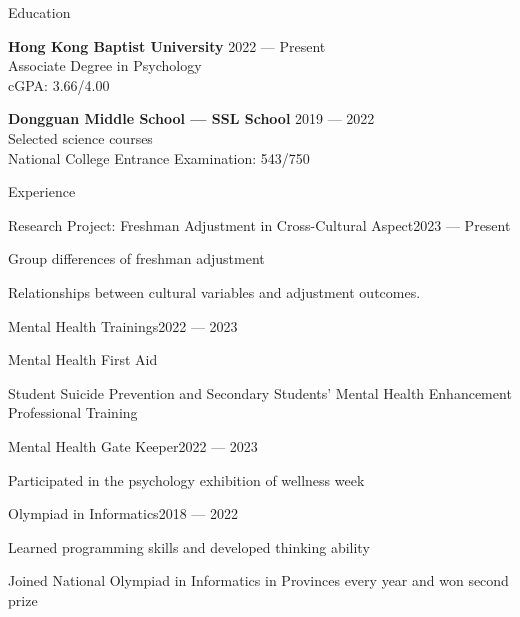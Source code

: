 \documentclass[
	11pt, %
]{resume} %
\begin{document}
\begin{rSection}{Education}

    \textbf{Hong Kong Baptist University} \hfill 2022 --- Present \\
    Associate Degree in Psychology \\
    cGPA: 3.66/4.00

    \textbf{Dongguan Middle School --- SSL School} \hfill 2019 --- 2022 \\
    Selected science courses \\
    National College Entrance Examination: 543/750

\end{rSection}


\begin{rSection}{Experience}

    \begin{rSubsection}{Research Project: Freshman Adjustment in Cross-Cultural Aspect}{2023 --- Present}{}{}
        \item Group differences of freshman adjustment
        \item Relationships between cultural variables and adjustment outcomes.
    \end{rSubsection}

    \begin{rSubsection}{Mental Health Trainings}{2022 --- 2023}{}{}
        \item Mental Health First Aid
        \item Student Suicide Prevention and Secondary Students' Mental Health Enhancement Professional Training
    \end{rSubsection}

    \begin{rSubsection}{Mental Health Gate Keeper}{2022 --- 2023}{}{}
        \item Participated in the psychology exhibition of wellness week
    \end{rSubsection}

    \begin{rSubsection}{Olympiad in Informatics}{2018 --- 2022}{}{}
        \item Learned programming skills and developed thinking ability
        \item Joined National Olympiad in Informatics in Provinces every year and won second prize
    \end{rSubsection}

\end{rSection}
\end{document}
